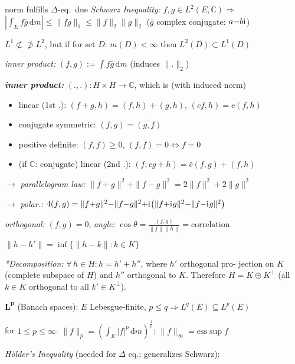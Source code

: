 \documentclass[8pt,twoside]{extarticle}
\newcommand{\compi}{\mathrm{i}\mkern1mu}
\begin{document}
\begin{multicols}{2}
norm fulfills $\Delta$-eq.\ due \textit{Schwarz Inequality:} $f,g\in L^2(E, \mathbb{C}) \Rightarrow$ $ |\int_E f\bar{g}\,\mathrm{d} m|\leq \|fg\|_1\leq \|f\|_2\|g\|_2$ ($\bar{g}$ complex conjugate: $a{-}b\compi$)

$L^1 \not\subset \not \supset L^2$, but if for set $D$: $m(D)<\infty$ then $L^2(D) \subset L^1(D)$

\textit{inner product:} $(f,g):=\int f\bar{g}\,\mathrm{d}m$ (induces $\|.\|_2$)

\textbf{\textit{inner product:}} $(.,.): H \times H \to \mathbb{C}$, which is (with induced norm)
\begin{itemize}[itemsep=0em, topsep=0pt, partopsep=0pt,parsep=0pt, leftmargin=1.0em]
\item linear (1st .): $(f{+}g,h)=(f,h)+(g,h)$, $(cf,h)=c(f,h)$
\item conjugate symmetric: $(f,g)=\overline{(g,f)}$
\item positive definite: $(f,f)\geq 0$, $(f,f)=0\Leftrightarrow f=0$
\item (if $\mathbb{C}$: conjugate) linear (2nd .): $(f,cg+h)=\bar{c}(f,g)+(f,h)$
\end{itemize}
$\to$ \textit{parallelogram law:} $\|f{+}g\|^2 + \|f{-}g\|^2 = 2\|f\|^2 + 2\|g\|^2$

$\to$ \textit{polar.:} $4(f,g)=\|f{+}g\|^2{-}\|f{-}g\|^2 {+}\compi\!\left( \|f{+}\compi g\|^2 {-} \|f{-}\compi g\|^2\right)$

\textit{orthogonal:} $(f,g)=0$, \textit{angle:} $\cos\theta = \frac{(f,g)}{\|f\|\|h\|}=\text{correlation}$

$\|h-h'\|=\inf \{\|h-k\|:k\in K\}$

\textit{*Decomposition:} $\forall \, h\in H: h=h'+h''$, where $h'$ orthogonal pro- jection on $K$ (complete subspace of $H$) and $h''$ orthogonal to $K$. Therefore $H=K\oplus K^{\perp}$ (all $k\in K$ orthogonal to all $k'\in K^{\perp}$).

\textbf{$\boldsymbol{L^p}$} (Banach spaces): $E$ Lebesgue-finite, $p\leq q \Rightarrow L^q(E)\subseteq L^p(E)$

for $1\leq p\leq \infty$: $\|f\|_p=\left(\int_E |f|^p\,\mathrm{d}m\right)^\frac{1}{p}$; $\|f\|_\infty=\mathrm{ess}\sup f$

\textit{Hölder's Inequality} (needed for $\Delta$ eq.; generalizes Schwarz): 


\end{multicols}
\end{document}
